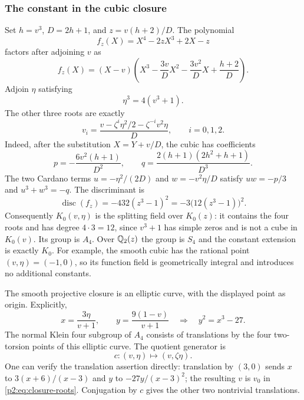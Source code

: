 \subsubsection{The constant in the cubic closure}
Set $h=v^3$, $D=2h+1$, and $z=v(h+2)/D$.  The polynomial
\[
 f_z(X)=X^4-2zX^3+2X-z
\]
factors after adjoining $v$ as
\[
 f_z(X)=(X-v)\left(X^3-\frac{3v}{D}X^2
                 -\frac{3v^2}{D}X+\frac{h+2}{D}\right).
\]
Adjoin $\eta$ satisfying
\begin{equation}\label{p2:eq:closure-constant}
 \eta^3=4(v^3+1).
\end{equation}
The other three roots are exactly
\begin{equation}\label{p2:eq:closure-roots}
 v_i=\frac{v-\zeta^i\eta^2/2-\zeta^{-i}v^2\eta}{D},
 \qquad i=0,1,2.
\end{equation}
Indeed, after the substitution $X=Y+v/D$, the cubic has coefficients
\[
 p=-\frac{6v^2(h+1)}{D^2},\qquad
 q=\frac{2(h+1)(2h^2+h+1)}{D^3}.
\]
The two Cardano terms $u=-\eta^2/(2D)$ and $w=-v^2\eta/D$
satisfy $uw=-p/3$ and $u^3+w^3=-q$.
The discriminant is
\[
 \operatorname{disc}(f_z)=-432(z^3-1)^2
                         =-3\bigl(12(z^3-1)\bigr)^2.
\]
Consequently $K_0(v,\eta)$ is the splitting field over $K_0(z)$:
it contains the four roots and has degree $4\cdot3=12$, since
$v^3+1$ has simple zeros and is not a cube in $K_0(v)$.
Its group is $A_4$.  Over $\mathbb Q_2(z)$ the group is $S_4$ and the
constant extension is exactly $K_0$.  For example, the smooth cubic
has the rational point $(v,\eta)=(-1,0)$, so its function field is
geometrically integral and introduces no additional constants.

The smooth projective closure is an elliptic curve, with the displayed
point as origin.  Explicitly,
\[
 x=\frac{3\eta}{v+1},\qquad y=\frac{9(1-v)}{v+1}
 \quad\Longrightarrow\quad y^2=x^3-27.
\]
The normal Klein four subgroup of $A_4$ consists of translations by
the four two-torsion points of this elliptic curve.  The quotient
generator is
\[
 c:(v,\eta)\longmapsto(v,\zeta\eta).
\]
One can verify the translation assertion directly: translation by
$(3,0)$ sends $x$ to $3(x+6)/(x-3)$ and $y$ to
$-27y/(x-3)^2$; the resulting $v$ is $v_0$ in
\eqref{p2:eq:closure-roots}.  Conjugation by $c$ gives the other two
nontrivial translations.

